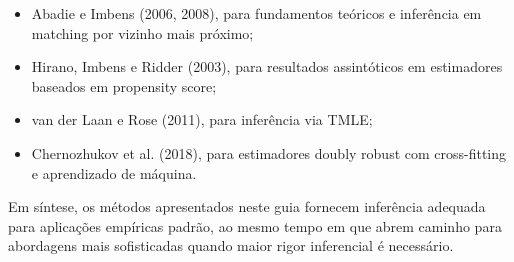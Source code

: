 \begin{itemize}
    \item Abadie e Imbens (2006, 2008), para fundamentos teóricos e inferência em matching por vizinho mais próximo;

\item Hirano, Imbens e Ridder (2003), para resultados assintóticos em estimadores baseados em propensity score;

\item van der Laan e Rose (2011), para inferência via TMLE;

\item Chernozhukov et al. (2018), para estimadores doubly robust com cross-fitting e aprendizado de máquina.
\end{itemize}

Em síntese, os métodos apresentados neste guia fornecem inferência adequada para aplicações empíricas padrão, ao mesmo tempo em que abrem caminho para abordagens mais sofisticadas quando maior rigor inferencial é necessário.
